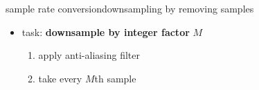 	\begin{frame}{sample rate conversion}{downsampling by removing samples}
        \vspace{-3mm}
        \begin{itemize}
            \item   task: \textbf{downsample by integer factor} $M$
            \pause 
            \begin{enumerate}
                \item   apply anti-aliasing filter
                \item   take every $M$th sample
            \end{enumerate}
        \end{itemize}
        \vspace{50mm}
    \end{frame}
